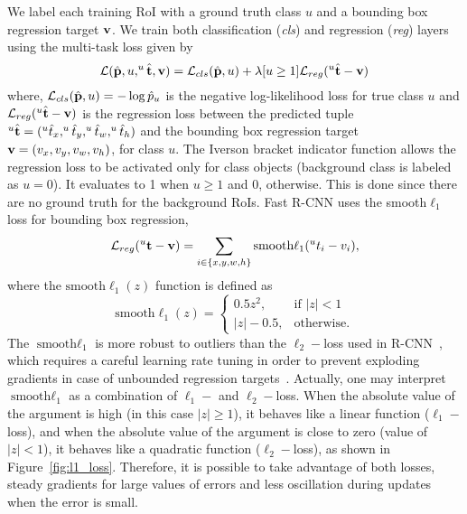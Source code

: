 We label each training RoI with a ground truth class $u$ and a bounding box regression target $\mathbf{v}$.
We train both classification ({\it cls}) and regression ({\it reg}) layers using the multi-task loss given by
%
\begin{equation}
 \mathcal{L} (\hat {\mathbf{p}},u,^u\hat {\mathbf{t}}, \mathbf{v})=
 \mathcal{L}_{cls} (\hat {\mathbf{p}}, u) +
 \lambda[u\geq1]\mathcal{L}_{reg} (^u\hat {\mathbf{t}} - \mathbf{v})
 \label{eq:loss_multi}
\end{equation}
%
where, $\mathcal{L}_{cls} (\hat {\mathbf{p}}, u) = -\log \hat p_u$  is the negative log-likelihood loss for true class $u$ and
$\mathcal{L}_{reg} (^u\hat {\mathbf{t}} - \mathbf{v})$ is the regression loss between the predicted tuple $^{u}\hat{\mathbf{t}} = (^{u}\hat t_{x}, ^{u}\hat t_{y}, ^{u}\hat t_{w}, ^{u}\hat t_{h})$ and the bounding box regression target $\mathbf{v} = (v_{x}, v_{y}, v_{w}, v_{h})$, for class $u$.
The Iverson bracket indicator function allows the regression loss to be activated only for class objects (background class is labeled as $u=0$).
It evaluates  to 1 when $u\geq1$ and 0, otherwise.
This is done since there are no ground truth for the background RoIs.
Fast R-CNN uses the smooth$\ell_1$ loss for bounding box regression,
%
\begin{equation}
 \mathcal{L}_{{reg}} (^u\mathbf{t} - \mathbf{v})=
 \sum_{i \in \{x,y,w,h\}} \textrm{smooth}{\ell_1}(^ut_i - v_i),
 \label{eq:loss_loc}
\end{equation}
%
where the $\textrm{smooth}\ell_1 (z)$ function is defined as
%
\begin{equation}
 \textrm{smooth}\ell_1 (z) =
 \begin{cases}
 0.5z^2, & \textrm{if } |z|< 1\\
 |z| - 0.5, & \textrm{otherwise}.
 \end{cases}
 \label{eq:smooth_l1}
\end{equation}
%
The  $\textrm{smooth}\ell_1$ is more robust to outliers than the $\ell_2-$loss used in R-CNN~\cite{Girshick2016RCNN}, which requires a careful learning rate tuning in order to prevent exploding gradients in case of unbounded regression targets~\cite{Girshick2015}.
Actually, one may interpret $\textrm{smooth}\ell_1$ as a combination of $\ell_1-$ and $\ell_2-$loss.
When the absolute value of the argument is high (in this case $|z|\geq 1$), it behaves like a linear function ($\ell_1-$loss),
and when the absolute value of the argument is close to zero (value of $|z|< 1$), it behaves like a quadratic function ($\ell_2-$loss), as shown in Figure~\ref{fig:l1_loss}.
Therefore, it is possible to take advantage of both losses, steady gradients for large values of errors and less oscillation during updates when the error is small.
